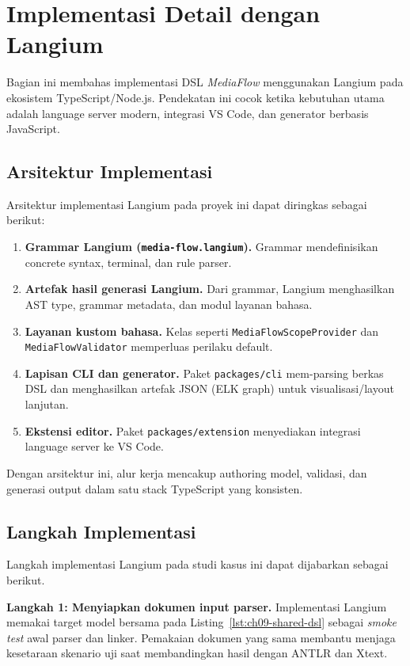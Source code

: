 \section{Implementasi Detail dengan Langium}

Bagian ini membahas implementasi DSL \textit{MediaFlow} menggunakan Langium pada ekosistem TypeScript/Node.js. Pendekatan ini cocok ketika kebutuhan utama adalah language server modern, integrasi VS Code, dan generator berbasis JavaScript.

\subsection{Arsitektur Implementasi}

Arsitektur implementasi Langium pada proyek ini dapat diringkas sebagai berikut:
\begin{enumerate}
  \item \textbf{Grammar Langium (\texttt{media-flow.langium}).} Grammar mendefinisikan concrete syntax, terminal, dan rule parser.
  \item \textbf{Artefak hasil generasi Langium.} Dari grammar, Langium menghasilkan AST type, grammar metadata, dan modul layanan bahasa.
  \item \textbf{Layanan kustom bahasa.} Kelas seperti \texttt{MediaFlowScopeProvider} dan \texttt{MediaFlowValidator} memperluas perilaku default.
  \item \textbf{Lapisan CLI dan generator.} Paket \texttt{packages/cli} mem-parsing berkas DSL dan menghasilkan artefak JSON (ELK graph) untuk visualisasi/layout lanjutan.
  \item \textbf{Ekstensi editor.} Paket \texttt{packages/extension} menyediakan integrasi language server ke VS Code.
\end{enumerate}

Dengan arsitektur ini, alur kerja mencakup authoring model, validasi, dan generasi output dalam satu stack TypeScript yang konsisten.

\subsection{Langkah Implementasi}

Langkah implementasi Langium pada studi kasus ini dapat dijabarkan sebagai berikut.

\textbf{Langkah 1: Menyiapkan dokumen input parser.} Implementasi Langium memakai target model bersama pada Listing~\ref{lst:ch09-shared-dsl} sebagai \textit{smoke test} awal parser dan linker. Pemakaian dokumen yang sama membantu menjaga kesetaraan skenario uji saat membandingkan hasil dengan ANTLR dan Xtext.


